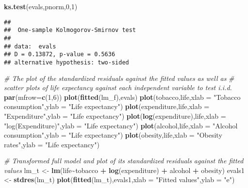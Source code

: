 \documentclass[
]{article}
\newenvironment{Shaded}{\begin{snugshade}}{\end{snugshade}}
\newcommand{\AttributeTok}[1]{\textcolor[rgb]{0.13,0.29,0.53}{#1}}
\newcommand{\CommentTok}[1]{\textcolor[rgb]{0.56,0.35,0.01}{\textit{#1}}}
\newcommand{\DecValTok}[1]{\textcolor[rgb]{0.00,0.00,0.81}{#1}}
\newcommand{\FunctionTok}[1]{\textcolor[rgb]{0.13,0.29,0.53}{\textbf{#1}}}
\newcommand{\NormalTok}[1]{#1}
\newcommand{\OtherTok}[1]{\textcolor[rgb]{0.56,0.35,0.01}{#1}}
\newcommand{\SpecialCharTok}[1]{\textcolor[rgb]{0.81,0.36,0.00}{\textbf{#1}}}
\newcommand{\StringTok}[1]{\textcolor[rgb]{0.31,0.60,0.02}{#1}}
\begin{document}
\begin{Shaded}
\begin{Highlighting}[]
\FunctionTok{ks.test}\NormalTok{(evals,pnorm,}\DecValTok{0}\NormalTok{,}\DecValTok{1}\NormalTok{)}
\end{Highlighting}
\end{Shaded}

\begin{verbatim}
## 
##  One-sample Kolmogorov-Smirnov test
## 
## data:  evals
## D = 0.13872, p-value = 0.5636
## alternative hypothesis: two-sided
\end{verbatim}

\begin{Shaded}
\begin{Highlighting}[]
\CommentTok{\# The plot of the standardized residuals against the fitted values as well as }
\CommentTok{\# scatter plots of life expectancy against each independent variable to test i.i.d.}
\FunctionTok{par}\NormalTok{(}\AttributeTok{mfrow=}\FunctionTok{c}\NormalTok{(}\DecValTok{1}\NormalTok{,}\DecValTok{6}\NormalTok{))}
\FunctionTok{plot}\NormalTok{(}\FunctionTok{fitted}\NormalTok{(lm\_f),evals)}
\FunctionTok{plot}\NormalTok{(tobacco,life,}\AttributeTok{xlab =} \StringTok{"Tobacco consumption"}\NormalTok{,}\AttributeTok{ylab =} \StringTok{"Life expectancy"}\NormalTok{)}
\FunctionTok{plot}\NormalTok{(expenditure,life,}\AttributeTok{xlab =} \StringTok{"Expenditure"}\NormalTok{,}\AttributeTok{ylab =} \StringTok{"Life expectancy"}\NormalTok{)}
\FunctionTok{plot}\NormalTok{(}\FunctionTok{log}\NormalTok{(expenditure),life,}\AttributeTok{xlab =} \StringTok{"log(Expenditure)"}\NormalTok{,}\AttributeTok{ylab =} \StringTok{"Life expectancy"}\NormalTok{)}
\FunctionTok{plot}\NormalTok{(alcohol,life,}\AttributeTok{xlab =} \StringTok{"Alcohol consumption"}\NormalTok{,}\AttributeTok{ylab =} \StringTok{"Life expectancy"}\NormalTok{)}
\FunctionTok{plot}\NormalTok{(obesity,life,}\AttributeTok{xlab =} \StringTok{"Obesity rates"}\NormalTok{,}\AttributeTok{ylab =} \StringTok{"Life expectancy"}\NormalTok{)}
\end{Highlighting}
\end{Shaded}

\begin{Shaded}
\begin{Highlighting}[]
\CommentTok{\# Transformed full model and plot of its standardized residuals against the fitted values}
\NormalTok{lm\_t }\OtherTok{\textless{}{-}} \FunctionTok{lm}\NormalTok{(life}\SpecialCharTok{\textasciitilde{}}\NormalTok{tobacco }\SpecialCharTok{+} \FunctionTok{log}\NormalTok{(expenditure) }\SpecialCharTok{+}\NormalTok{ alcohol }\SpecialCharTok{+}\NormalTok{ obesity)}
\NormalTok{evals1 }\OtherTok{\textless{}{-}} \FunctionTok{stdres}\NormalTok{(lm\_t)}
\FunctionTok{plot}\NormalTok{(}\FunctionTok{fitted}\NormalTok{(lm\_t),evals1,}\AttributeTok{xlab =} \StringTok{"Fitted values"}\NormalTok{,}\AttributeTok{ylab =} \StringTok{"e"}\NormalTok{)}
\end{Highlighting}
\end{Shaded}
\end{document}
